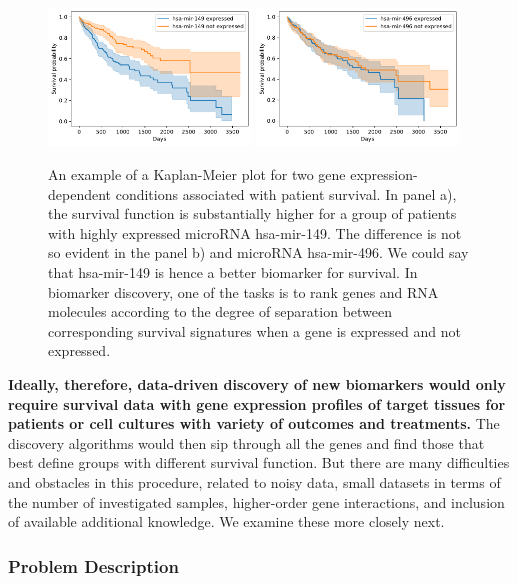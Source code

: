 \documentclass[11pt,a4paper]{article}
\renewcommand{\bold}{\textbf}
\begin{document}
\begin{figure}
\includegraphics[width=0.48\textwidth]{hsa-mir-149}\hfill
\includegraphics[width=0.48\textwidth]{hsa-mir-496}
\caption{An example of a Kaplan-Meier plot for two gene expression-dependent conditions associated with patient survival. In panel a), the survival function is substantially higher for a group of patients with highly expressed microRNA hsa-mir-149. The difference is not so evident in the panel b) and microRNA hsa-mir-496. We could say that hsa-mir-149 is hence a better biomarker for survival. In biomarker discovery, one of the tasks is to rank genes and RNA molecules according to the degree of separation between corresponding survival signatures when a gene is expressed and not expressed.}
\label{fig:km-marker}
\end{figure}

\bold{Ideally, therefore, data-driven discovery of new biomarkers would only require survival data with gene expression profiles of target tissues for patients or cell cultures with variety of outcomes and treatments.} The discovery algorithms would then sip through all the genes and find those that best define groups with different survival function. But there are many difficulties and obstacles in this procedure, related to noisy data, small datasets in terms of the number of investigated samples, higher-order gene interactions, and inclusion of available additional knowledge. We examine these more closely next.

\subsubsection*{Problem Description}
\end{document}
